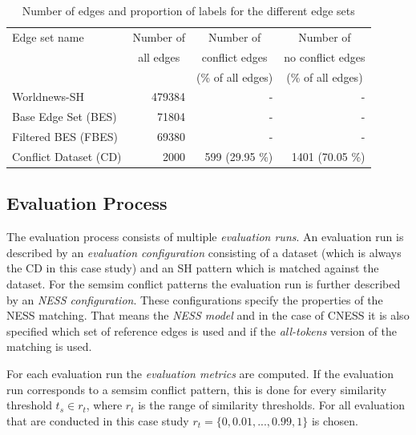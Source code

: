 \documentclass[11pt]{scrreprt}
\begin{document}
\begin{table}
\centering
\begin{tabular}{lrrr}
\toprule
\multicolumn{1}{l}{Edge set name}	& \multicolumn{1}{c}{Number of} 		& \multicolumn{1}{c}{Number of} 		& \multicolumn{1}{c}{Number of} \\
\multicolumn{1}{l}{} 				& \multicolumn{1}{c}{all edges} 		& \multicolumn{1}{c}{conflict edges} 	& \multicolumn{1}{c}{no conflict edges} \\
\multicolumn{1}{l}{} 				& \multicolumn{1}{c}{} 				& \multicolumn{1}{c}{(\% of all edges)} & \multicolumn{1}{c}{(\% of all edges)} \\
\midrule
Worldnews-SH						& 479384		& -					& - \\
Base Edge Set (BES)					& 71804		& -					& - \\
Filtered BES (FBES)					& 69380 		& - 					& - \\
Conflict Dataset (CD)				& 2000 		& 599 (29.95 \%) 	& 1401 (70.05 \%) \\
\bottomrule
\end{tabular}
\caption{Number of edges and proportion of labels for the different edge sets}
\label{tab:dataset-descriptions}
\end{table}


\subsection{Evaluation Process}
The evaluation process consists of multiple \textit{evaluation runs}. An evaluation run is described by an \textit{evaluation configuration} consisting of a dataset (which is always the CD in this case study) and an SH pattern which is matched against the dataset. For the semsim conflict patterns the evaluation run is further described by an \textit{NESS configuration}. These configurations specify the properties of the NESS matching. That means the \textit{NESS model} and in the case of CNESS it is also specified which set of reference edges is used and if the \textit{all-tokens} version of the matching is used. 

For each evaluation run the \textit{evaluation metrics} are computed. If the evaluation run corresponds to a semsim conflict pattern, this is done for every similarity threshold \(t_s \in r_t\), where \(r_t\) is the range of similarity thresholds. For all evaluation that are conducted in this case study \( r_t= \{0, 0.01, ...,  0.99, 1\}\) is chosen.
\end{document}
